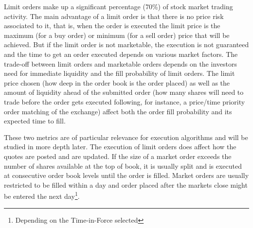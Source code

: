 Limit orders make up a significant percentage (70\%) of stock market trading activity. The main advantage of a limit order is that there is no price risk associated to it, that is, when the order is executed the limit price is the maximum (for a buy order) or minimum (for a sell order) price that will be achieved. But if the limit order is not marketable, the execution is not guaranteed and the time to get an order executed depends on various market factors. The trade-off between limit orders and marketable orders depends on the investors need for immediate liquidity and the fill probability of limit orders. The limit price chosen (how deep in the order book is the order placed) as well as the amount of liquidity ahead of the submitted order (how many shares will need to trade before the order gets executed following, for instance, a price/time priority order matching of the exchange) affect both the order fill probability and its expected time to fill. 


These two metrics are of particular relevance for execution algorithms and will be studied in more depth later. The execution of limit orders does affect how the quotes are posted and are updated. If the size of a market order exceeds the number of shares available at the top of book, it is usually split and is executed at consecutive order book levels until the order is filled. Market orders are usually restricted to be filled within a day and order placed after the markets close might be entered the next day\footnote{Depending on the Time-in-Force selected}.\\

